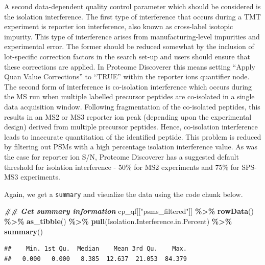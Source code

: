\documentclass[9pt,a4paper,]{extarticle}
\newenvironment{Shaded}{\begin{snugshade}}{\end{snugshade}}
\newcommand{\DocumentationTok}[1]{\textcolor[rgb]{0.56,0.35,0.01}{\textbf{\textit{#1}}}}
\newcommand{\FunctionTok}[1]{\textcolor[rgb]{0.13,0.29,0.53}{\textbf{#1}}}
\newcommand{\NormalTok}[1]{#1}
\newcommand{\SpecialCharTok}[1]{\textcolor[rgb]{0.81,0.36,0.00}{\textbf{#1}}}
\newcommand{\StringTok}[1]{\textcolor[rgb]{0.31,0.60,0.02}{#1}}
\begin{document}
A second data-dependent quality control parameter which should be considered is
the isolation interference. The first type of interference that occurs during a
TMT experiment is reporter ion interference, also known as cross-label isotopic
impurity. This type of interference arises from manufacturing-level impurities
and experimental error. The former should be reduced somewhat by the inclusion
of lot-specific correction factors in the search set-up and users should ensure
that these corrections are applied. In Proteome Discoverer this means setting
``Apply Quan Value Corrections'' to ``TRUE'' within the reporter ions quantifier
node. The second form of interference is co-isolation interference which occurs
during the MS run when multiple labelled precursor peptides are co-isolated in a
single data acquisition window. Following fragmentation of the co-isolated
peptides, this results in an MS2 or MS3 reporter ion peak (depending upon the
experimental design) derived from multiple precursor peptides. Hence,
co-isolation interference leads to inaccurate quantitation of the identified
peptide. This problem is reduced by filtering out PSMs with a high percentage
isolation interference value. As was the case for reporter ion S/N, Proteome
Discoverer has a suggested default threshold for isolation interference - 50\%
for MS2 experiments and 75\% for SPS-MS3 experiments.

Again, we get a \texttt{summary} and visualize the data using the code chunk below.

\begin{Shaded}
\begin{Highlighting}[]
\DocumentationTok{\#\# Get summary information}
\NormalTok{cp\_qf[[}\StringTok{"psms\_filtered"}\NormalTok{]] }\SpecialCharTok{\%\textgreater{}\%} 
  \FunctionTok{rowData}\NormalTok{() }\SpecialCharTok{\%\textgreater{}\%} 
  \FunctionTok{as\_tibble}\NormalTok{() }\SpecialCharTok{\%\textgreater{}\%} 
  \FunctionTok{pull}\NormalTok{(Isolation.Interference.in.Percent) }\SpecialCharTok{\%\textgreater{}\%} 
  \FunctionTok{summary}\NormalTok{()}
\end{Highlighting}
\end{Shaded}

\begin{verbatim}
##    Min. 1st Qu.  Median    Mean 3rd Qu.    Max. 
##   0.000   0.000   8.385  12.637  21.053  84.379
\end{verbatim}
\end{document}
